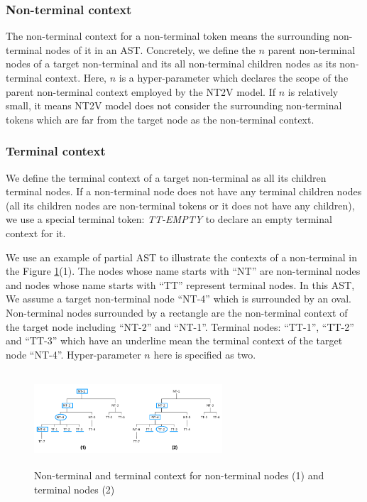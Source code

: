 \documentclass[E]{compsoft}
\begin{document}
\subsubsection{Non-terminal context}
The non-terminal context for a non-terminal token means the surrounding non-terminal nodes of it in an AST. 
Concretely, we define the $n$ parent non-terminal nodes of a target non-terminal and its all non-terminal children nodes as its non-terminal context.
Here, $n$ is a hyper-parameter which declares the scope of the parent non-terminal context employed by the NT2V model. 
If $n$ is relatively small, it means NT2V model does not consider the surrounding non-terminal tokens which are far from the target node as the non-terminal context.

\subsubsection{Terminal context} 
We define the terminal context of a target non-terminal as all its children terminal nodes. 
If a non-terminal node does not have any terminal children nodes (all its children nodes are non-terminal tokens or it does not have any children), we use a special terminal token: \textit{TT-EMPTY} to declare an empty terminal context for it.

We use an example of partial AST to illustrate the contexts of a non-terminal in the Figure \ref{fig:node2vec-context}(1). The nodes whose name starts with ``NT'' are non-terminal nodes and nodes whose name starts with ``TT'' represent terminal nodes. 
In this AST, We assume a target non-terminal node ``NT-4'' which is surrounded by an oval. 
Non-terminal nodes surrounded by a rectangle are the non-terminal context of the target node including ``NT-2'' and ``NT-1''. 
Terminal nodes: ``TT-1'', ``TT-2'' and ``TT-3'' which have an underline mean the terminal context of the target node ``NT-4''. 
Hyper-parameter $n$ here is specified as two.


\begin{figure}[!ht]
\centering
\includegraphics[width=7cm, height=3.5cm]{pictures/node2vec_context.png}
\caption{Non-terminal and terminal context for non-terminal nodes (1) and terminal nodes (2)}
\label{fig:node2vec-context}
\end{figure}
\end{document}
